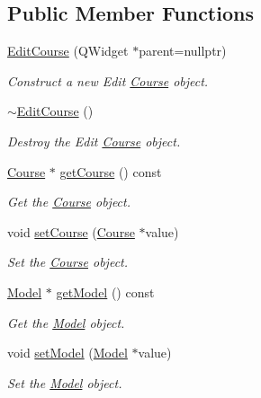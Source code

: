 \subsection*{Public Member Functions}
\begin{DoxyCompactItemize}
\item 
\hyperlink{classEditCourse_a9ef9057273412ffc11c923812781a817}{Edit\+Course} (Q\+Widget $\ast$parent=nullptr)
\begin{DoxyCompactList}\small\item\em Construct a new Edit \hyperlink{classCourse}{Course} object. \end{DoxyCompactList}\item 
\hyperlink{classEditCourse_a2820ede4b925099e088e288a48825485}{$\sim$\+Edit\+Course} ()
\begin{DoxyCompactList}\small\item\em Destroy the Edit \hyperlink{classCourse}{Course} object. \end{DoxyCompactList}\item 
\hyperlink{classCourse}{Course} $\ast$ \hyperlink{classEditCourse_a7e3f0d830ad339eab414d7fed354b4d9}{get\+Course} () const
\begin{DoxyCompactList}\small\item\em Get the \hyperlink{classCourse}{Course} object. \end{DoxyCompactList}\item 
void \hyperlink{classEditCourse_a263030185cb0d1f790b66be18cef630f}{set\+Course} (\hyperlink{classCourse}{Course} $\ast$value)
\begin{DoxyCompactList}\small\item\em Set the \hyperlink{classCourse}{Course} object. \end{DoxyCompactList}\item 
\hyperlink{classModel}{Model} $\ast$ \hyperlink{classEditCourse_a6c26566b7caaf2f44192bfc47b71212d}{get\+Model} () const
\begin{DoxyCompactList}\small\item\em Get the \hyperlink{classModel}{Model} object. \end{DoxyCompactList}\item 
void \hyperlink{classEditCourse_a055cf5be8cfb3e5af3910876e8285d98}{set\+Model} (\hyperlink{classModel}{Model} $\ast$value)
\begin{DoxyCompactList}\small\item\em Set the \hyperlink{classModel}{Model} object. \end{DoxyCompactList}\end{DoxyCompactItemize}
